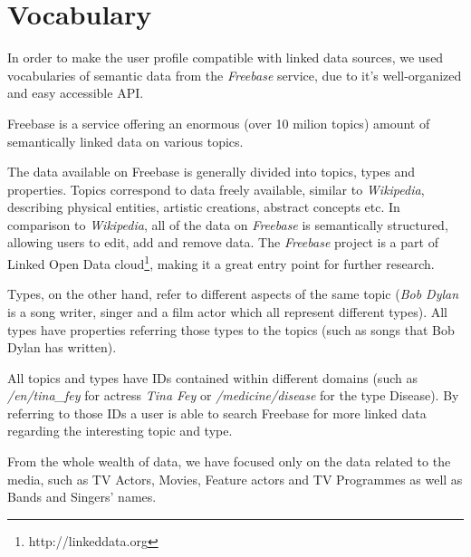 \section{Vocabulary}

In order to make the user profile compatible with linked data sources, we used
vocabularies of semantic data from the \textit{Freebase} service, due to it's
well-organized and easy accessible API.

Freebase is a service offering an enormous (over 10 milion topics) amount of semantically linked data on various topics.

The data available on Freebase is generally divided into topics, types and properties. Topics correspond to data freely
available, similar to \textit{Wikipedia}, describing physical entities, artistic creations, abstract concepts etc. In comparison
to \textit{Wikipedia}, all of the data on \textit{Freebase} is semantically structured, allowing users to edit, add and remove data. The \textit{Freebase} project is a part of Linked Open Data cloud\footnote{http://linkeddata.org}, making it a great
entry point for further research.

Types, on the other hand, refer to different aspects of the same topic (\eg \textit{Bob Dylan} is a song writer,
singer and a film actor which all represent different types). All types have properties referring those
types to the topics (such as songs that Bob Dylan has written).

All topics and types have IDs contained within different domains (such as \textit{/en/tina\_fey} for actress \textit{Tina Fey}
or \textit{/medicine/disease} for the type Disease). By referring to those IDs a user is able to search Freebase for
more linked data regarding the interesting topic and type.

From the whole wealth of data, we have focused only on the data related to the media, such as TV Actors, Movies, Feature
actors and TV Programmes as well as Bands and Singers' names.